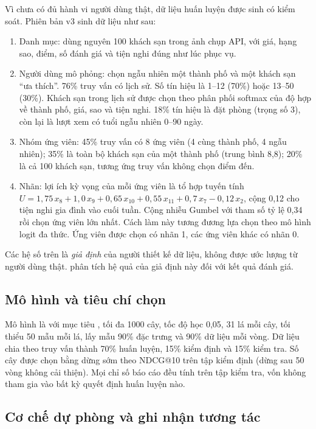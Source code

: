 Vì chưa có đủ hành vi người dùng thật, dữ liệu huấn luyện được sinh có kiểm soát. Phiên bản v3 sinh dữ liệu như sau:
\begin{enumerate}
\item Danh mục: dùng nguyên 100 khách sạn trong ảnh chụp API, với giá, hạng sao, điểm, số đánh giá và tiện nghi đúng như lúc phục vụ.
\item Người dùng mô phỏng: chọn ngẫu nhiên một thành phố và một khách sạn ``ưa thích''. 76\% truy vấn có lịch sử. Số tín hiệu là 1--12 (70\%) hoặc 13--50 (30\%). Khách sạn trong lịch sử được chọn theo phân phối softmax của độ hợp về thành phố, giá, sao và tiện nghi. 18\% tín hiệu là đặt phòng (trọng số 3), còn lại là lượt xem có tuổi ngẫu nhiên 0--90 ngày.
\item Nhóm ứng viên: 45\% truy vấn có 8 ứng viên (4 cùng thành phố, 4 ngẫu nhiên); 35\% là toàn bộ khách sạn của một thành phố (trung bình 8,8); 20\% là cả 100 khách sạn, tương ứng truy vấn không chọn điểm đến.
\item Nhãn: lợi ích kỳ vọng của mỗi ứng viên là tổ hợp tuyến tính
$U = 1{,}75\,x_8 + 1{,}0\,x_9 + 0{,}65\,x_{10} + 0{,}55\,x_{11} + 0{,}7\,x_7 - 0{,}12\,x_2$, cộng 0,12 cho tiện nghi gia đình vào cuối tuần. Cộng nhiễu Gumbel với tham số tỷ lệ 0,34 rồi chọn ứng viên lớn nhất. Cách làm này tương đương lựa chọn theo mô hình logit đa thức. Ứng viên được chọn có nhãn 1, các ứng viên khác có nhãn 0.
\end{enumerate}
Các hệ số trên là \emph{giả định} của người thiết kế dữ liệu, không được ước lượng từ người dùng thật.  phân tích hệ quả của giả định này đối với kết quả đánh giá.

\subsection{Mô hình và tiêu chí chọn}

Mô hình là  với mục tiêu , tối đa 1000 cây, tốc độ học 0,05, 31 lá mỗi cây, tối thiểu 50 mẫu mỗi lá, lấy mẫu 90\% đặc trưng và 90\% dữ liệu mỗi vòng. Dữ liệu chia theo truy vấn thành 70\% huấn luyện, 15\% kiểm định và 15\% kiểm tra. Số cây được chọn bằng dừng sớm theo NDCG@10 trên tập kiểm định (dừng sau 50 vòng không cải thiện). Mọi chỉ số báo cáo đều tính trên tập kiểm tra, vốn không tham gia vào bất kỳ quyết định huấn luyện nào.

\subsection{Cơ chế dự phòng và ghi nhận tương tác}

